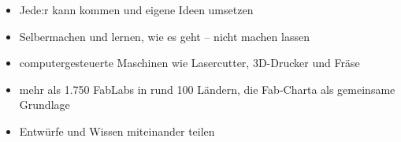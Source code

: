 \begin{itemize}
  \item Jede:r kann kommen und eigene Ideen umsetzen
  \item Selbermachen und lernen, wie es geht -- nicht machen lassen
\end{itemize}
\vspace{10mm}
\begin{itemize}
  \item computergesteuerte Maschinen wie Lasercutter, 3D-Drucker und
    Fräse
\end{itemize}
\vspace{10mm}
\begin{itemize}
  \item mehr als 1.750 FabLabs in rund 100 Ländern, die Fab-Charta als
    gemeinsame Grundlage
  \item Entwürfe und Wissen miteinander teilen
\end{itemize}
